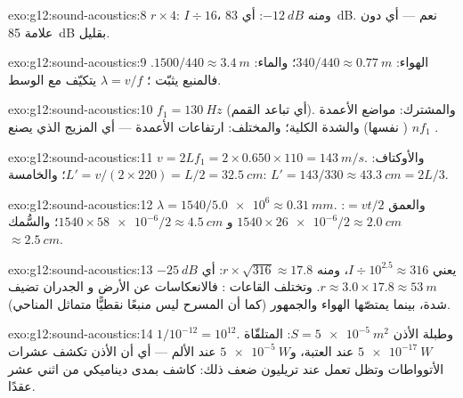 \begin{solution}{exo:g12:sound-acoustics:8}
$r \times 4$: $I \div 16$، ومنه $-\qty{12}{dB}$: أي \qty{83}{dB}. نعم ---
أي دون علامة \qty{85}{dB} بقليل.
\end{solution}

\begin{solution}{exo:g12:sound-acoustics:9}
الهواء: $340/440 \approx \qty{0.77}{m}$؛ والماء: $1500/440 \approx
\qty{3.4}{m}$. فالمنبع يثبّت ؛ 
$\lambda = v/f$ يتكيّف مع الوسط.
\end{solution}

\begin{solution}{exo:g12:sound-acoustics:10}
$f_1 = \qty{130}{Hz}$ (أي تباعد القمم). والمشترك: مواضع الأعمدة
$nf_1$ ( نفسها) والشدة الكلية؛ والمختلف: ارتفاعات
الأعمدة --- أي المزيج الذي يصنع .
\end{solution}

\begin{solution}{exo:g12:sound-acoustics:11}
$v = 2Lf_1 = 2 \times 0.650 \times 110 = \qty{143}{m/s}$. والأوكتاف:
$L' = v/(2 \times 220) = L/2 = \qty{32.5}{cm}$؛ والخامسة:
$L' = 143/330 \approx \qty{43.3}{cm} = 2L/3$.
\end{solution}

\begin{solution}{exo:g12:sound-acoustics:12}
$\lambda = 1540/\num{5.0e6} \approx \qty{0.31}{mm}$. والعمق $= vt/2$:
$1540 \times \num{26e-6}/2 \approx \qty{2.0}{cm}$ و
$1540 \times \num{58e-6}/2 \approx \qty{4.5}{cm}$؛ والسُّمك
$\approx \qty{2.5}{cm}$.
\end{solution}

\begin{solution}{exo:g12:sound-acoustics:13}
$-\qty{25}{dB}$ يعني $I \div 10^{2.5} \approx 316$، ومنه
$r \times \sqrt{316} \approx 17.8$: أي $r \approx 3.0 \times 17.8
\approx \qty{53}{m}$. وتختلف القاعات : فالانعكاسات عن الأرض و
الجدران تضيف شدة، بينما يمتصّها الهواء والجمهور (كما أن
المسرح ليس منبعًا نقطيًّا متماثل المناحي).
\end{solution}

\begin{solution}{exo:g12:sound-acoustics:14}
$1/10^{-12} = 10^{12}$. وطبلة الأذن $S = \qty{5e-5}{m^2}$: 
المتلقّاة $\qty{5e-17}{W}$ عند العتبة، و$\qty{5e-5}{W}$ عند الألم --- أي أن
الأذن تكشف عشرات الأتوواطات وتظل تعمل عند تريليون ضعف
ذلك: كاشف بمدى ديناميكي من اثني عشر عقدًا.
\end{solution}


